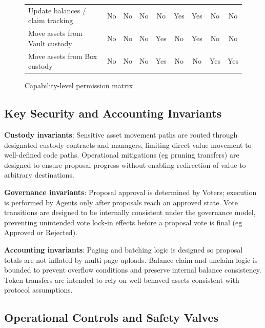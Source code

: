 \documentclass[10pt]{article}
\begin{document}
\begin{figure}[h!]
\begin{tabularx}{\textwidth}{lcccccccc}
        Update balances / claim tracking           & No                     & No             & No             & No             & Yes             & Yes              & No                  & No              \\
        Move assets from Vault custody             & No                     & No             & No             & Yes            & No              & Yes              & No                  & No              \\
        Move assets from Box custody               & No                     & No             & No             & Yes            & No              & No               & Yes                 & Yes             \\
        \bottomrule
    \end{tabularx}
    \caption{Capability-level permission matrix}
    \label{tab:permission-matrix}
\end{figure}

\subsection{Key Security and Accounting Invariants}

\textbf{Custody invariants}: Sensitive asset movement paths are routed through designated custody contracts and managers, limiting direct value movement to well-defined code paths. Operational mitigations (eg pruning transfers) are designed to ensure proposal progress without enabling redirection of value to arbitrary destinations.

\textbf{Governance invariants}: Proposal approval is determined by Voters; execution is performed by Agents only after proposals reach an approved state. Vote transitions are designed to be internally consistent under the governance model, preventing unintended vote lock-in effects before a proposal vote is final (eg Approved or Rejected).

\textbf{Accounting invariants}: Paging and batching logic is designed so proposal totals are not inflated by multi-page uploads. Balance claim and unclaim logic is bounded to prevent overflow conditions and preserve internal balance consistency. Token transfers are intended to rely on well-behaved assets consistent with protocol assumptions.

\subsection{Operational Controls and Safety Valves}
\end{document}
